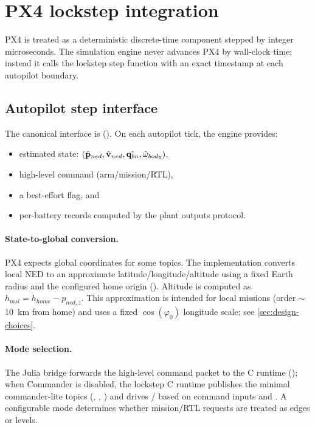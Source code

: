 \section{PX4 lockstep integration}
\label{sec:px4-bridge}

PX4 is treated as a deterministic discrete-time component stepped by integer microseconds. The simulation engine never advances PX4 by wall-clock time; instead it calls the lockstep step function with an exact  timestamp at each autopilot boundary.

\subsection{Autopilot step interface}

The canonical interface is  (). On each autopilot tick, the engine provides:
\begin{itemize}[leftmargin=*,itemsep=2pt]
  \item estimated state: $(\hat{\mathbf{p}}_{ned}, \hat{\mathbf{v}}_{ned}, \hat{\mathbf{q}_{bn}}, \hat{\mathbf{\omega}}_{body})$,
  \item high-level command  (arm/mission/RTL),
  \item a best-effort  flag, and
  \item per-battery  records computed by the plant outputs protocol.
\end{itemize}

\paragraph{State-to-global conversion.}
PX4 expects global coordinates for some topics. The implementation converts local NED to an approximate latitude/longitude/altitude using a fixed Earth radius and the configured home origin (). Altitude is computed as $h_{msl}=h_{home}-p_{ned,z}$. This approximation is intended for local missions (order \(\sim\)\SI{10}{km} from home) and uses a fixed \(\cos(\varphi_0)\) longitude scale; see \cref{sec:design-choices}.

\paragraph{Mode selection.}
The Julia bridge forwards the high-level command packet to the C runtime (); when Commander is disabled, the lockstep C runtime publishes the minimal commander‑lite topics (, , ) and drives / based on command inputs and . A configurable  mode determines whether mission/RTL requests are treated as edges or levels.

